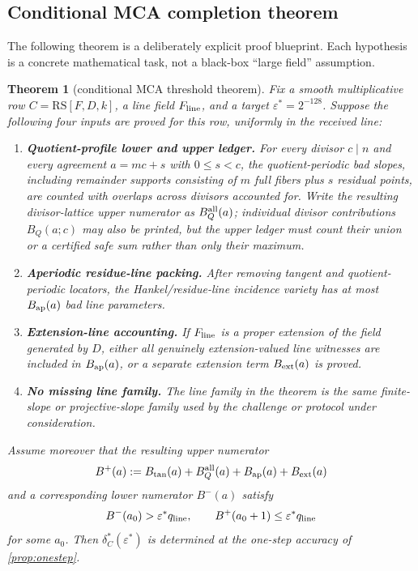 \documentclass[11pt]{article}
\newtheorem{theorem}{Theorem}[section]
\theoremstyle{definition}
\theoremstyle{remark}
\newcommand{\RS}{\mathrm{RS}}
\begin{document}
\subsection{Conditional MCA completion theorem}

The following theorem is a deliberately explicit proof blueprint.  Each
hypothesis is a concrete mathematical task, not a black-box ``large field''
assumption.

\begin{theorem}[conditional MCA threshold theorem]\label{thm:conditional-mca}
Fix a smooth multiplicative row $C=\RS[F,D,k]$, a line field $F_{\rm line}$, and
a target $\varepsilon^*=2^{-128}$.  Suppose the following four inputs are proved
for this row, uniformly in the received line:
\begin{enumerate}[label=(\roman*),leftmargin=2.2em]
\item \textbf{Quotient-profile lower and upper ledger.}  For every divisor
$c\mid n$ and every agreement $a=mc+s$ with $0\le s<c$, the quotient-periodic
bad slopes, including remainder supports consisting of $m$ full fibers plus
$s$ residual points, are counted with overlaps across divisors accounted for.
Write the resulting divisor-lattice upper numerator as $B_Q^{\rm all}(a)$;
individual divisor contributions $B_Q(a;c)$ may also be printed, but the upper
ledger must count their union or a certified safe sum rather than only their
maximum.
\item \textbf{Aperiodic residue-line packing.}  After removing tangent and
quotient-periodic locators, the Hankel/residue-line incidence variety has at
most $B_{\rm ap}(a)$ bad line parameters.
\item \textbf{Extension-line accounting.}  If $F_{\rm line}$ is a proper
extension of the field generated by $D$, either all genuinely extension-valued
line witnesses are included in $B_{\rm ap}(a)$, or a separate extension term
$B_{\rm ext}(a)$ is proved.
\item \textbf{No missing line family.}  The line family in the theorem is the
same finite-slope or projective-slope family used by the challenge or protocol
under consideration.
\end{enumerate}
Assume moreover that the resulting upper numerator
\[
        B^+(a):=B_{\rm tan}(a)+B_Q^{\rm all}(a)
                +B_{\rm ap}(a)+B_{\rm ext}(a)
\]
and a corresponding lower numerator $B^-(a)$ satisfy
\[
        B^-(a_0)>\varepsilon^* q_{\rm line},
        \qquad
        B^+(a_0+1)\le\varepsilon^* q_{\rm line}
\]
for some $a_0$.  Then $\delta_C^*(\varepsilon^*)$ is determined at the
one-step accuracy of \cref{prop:onestep}.
\end{theorem}
\end{document}
